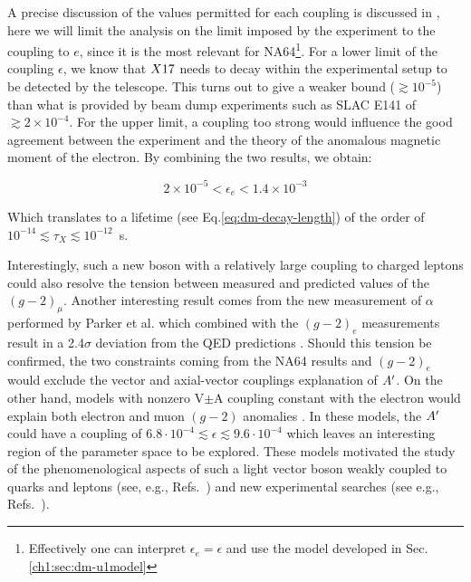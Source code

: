 A precise discussion of the values permitted for each coupling is discussed in \cite{Feng:2016jff,PhysRevD.95.035017}, here we will limit the analysis on the limit imposed by the experiment to the coupling to $e$, since it is the most relevant for NA64\footnote{Effectively one can interpret $\epsilon_e = \epsilon$ and use the model developed in Sec.\ref{ch1:sec:dm-u1model}}. For a lower limit of the coupling $\epsilon$, we know that $X17$ needs to decay within the experimental setup to be detected by the telescope. This turns out to give a weaker bound ($\gtrsim 10^{-5}$) than what is provided by beam dump experiments such as SLAC E141 \cite{blum} of $\gtrsim 2 \times 10^{-4}$. For the upper limit, a coupling too strong would influence the good agreement between the experiment and the theory of the anomalous magnetic moment of the electron. By combining the two results, we obtain:

\begin{equation}
  \label{eq:x17-limits}
  2 \times 10^{-5} < \epsilon_e < 1.4 \times 10^{-3}
\end{equation}

Which translates to a lifetime (see Eq.\ref{eq:dm-decay-length}) of the order of $10^{-14}\lesssim \tau_X \lesssim 10^{-12}$~s.

Interestingly, such a new boson with a relatively large coupling to charged leptons could also resolve the tension between measured and predicted values of the $(g - 2)_{\mu}$. Another interesting result comes from the new measurement of $\alpha$ performed by Parker et al. \cite{Parker191} which combined with the $(g-2)_e$ measurements result in a 2.4$\sigma$ deviation from the QED predictions \cite{PhysRevLett.100.120801}. Should this tension be confirmed, the two constraints coming from the NA64 results and $(g - 2)_e$ would exclude the vector and axial-vector couplings explanation of $A'$. On the other hand, models with nonzero V$\pm$A coupling constant with the electron would explain both electron and muon $(g - 2)$ anomalies \cite{Krasnikov:2019dgh}. In these models, the $A'$ could have a coupling of $6.8\cdot 10^{-4} \lesssim \epsilon \lesssim 9.6 \cdot 10^{-4}$ which leaves an interesting region of the parameter space to be explored. These models motivated the study of the phenomenological aspects of such a light vector boson weakly coupled to quarks and leptons (see, e.g., Refs.~\cite{fayet1, fayet2, fayet3, fayet4,jk, cheng, Zhang:2017zap, ia, liang, bart}) and new experimental searches (see e.g., Refs.~\cite{battaglieri2017cosmic, nardi}).

